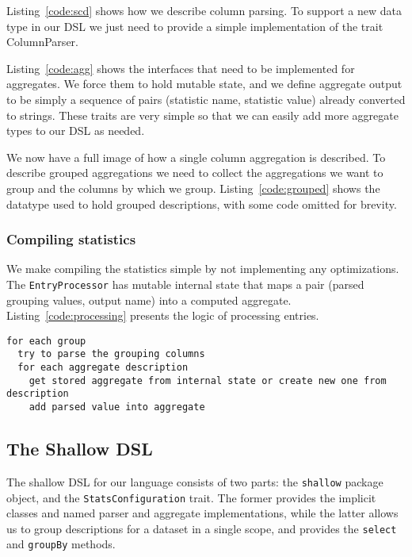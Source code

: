 Listing~\ref{code:scd} shows how we describe column parsing.
To support a new data type in our DSL we just need to provide a simple implementation of the trait ColumnParser.

Listing~\ref{code:agg} shows the interfaces that need to be implemented for aggregates.
We force them to hold mutable state, and we define aggregate output to be simply a sequence of pairs (statistic name, statistic value) already converted to strings.
These traits are very simple so that we can easily add more aggregate types to our DSL as needed.

We now have a full image of how a single column aggregation is described.
To describe grouped aggregations we need to collect the aggregations we want to group and the columns by which we group.
Listing~\ref{code:grouped} shows the datatype used to hold grouped descriptions, with some code omitted for brevity.

\subsubsection{Compiling statistics}
We make compiling the statistics simple by not implementing any optimizations.
The \texttt{EntryProcessor} has mutable internal state that maps a pair (parsed grouping values, output name) into a computed aggregate.
Listing~\ref{code:processing} presents the logic of processing entries.

\begin{lstlisting}[caption=Processing entries, label=code:processing,float,floatplacement=H]
for each group
  try to parse the grouping columns
  for each aggregate description
    get stored aggregate from internal state or create new one from description
    add parsed value into aggregate
\end{lstlisting}

\subsection{The Shallow DSL}

The shallow DSL for our language consists of two parts: the \texttt{shallow} package object, and the \texttt{StatsConfiguration} trait.
The former provides the implicit classes and named parser and aggregate implementations, while the latter allows us to group descriptions for a dataset in a single scope, and provides the  \texttt{select} and \texttt{groupBy} methods.

